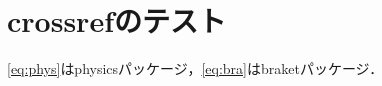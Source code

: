 \documentclass[../main.tex]{subfiles}
\begin{document}
\section{crossrefのテスト}
\ref{eq:phys}はphysicsパッケージ，\ref{eq:bra}はbraketパッケージ．
\end{document}
